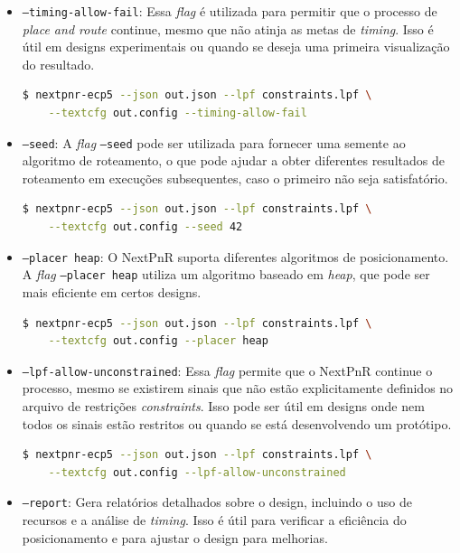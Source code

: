 \documentclass{report}
\begin{document}
\begin{itemize}
\item \texttt{--timing-allow-fail}: Essa \textit{flag} é utilizada para permitir que o processo de \textit{place and route} continue, mesmo que não atinja as metas de \textit{timing}. Isso é útil em designs experimentais ou quando se deseja uma primeira visualização do resultado.

\begin{lstlisting}[language=bash]
$ nextpnr-ecp5 --json out.json --lpf constraints.lpf \
    --textcfg out.config --timing-allow-fail
\end{lstlisting}

\item \texttt{--seed}: A \textit{flag} \texttt{--seed} pode ser utilizada para fornecer uma semente ao algoritmo de roteamento, o que pode ajudar a obter diferentes resultados de roteamento em execuções subsequentes, caso o primeiro não seja satisfatório.

\begin{lstlisting}[language=bash]
$ nextpnr-ecp5 --json out.json --lpf constraints.lpf \
    --textcfg out.config --seed 42
\end{lstlisting}

\item \texttt{--placer heap}: O NextPnR suporta diferentes algoritmos de posicionamento. A \textit{flag} \texttt{--placer heap} utiliza um algoritmo baseado em \textit{heap}, que pode ser mais eficiente em certos designs.

\begin{lstlisting}[language=bash]
$ nextpnr-ecp5 --json out.json --lpf constraints.lpf \
    --textcfg out.config --placer heap
\end{lstlisting}

\item \texttt{--lpf-allow-unconstrained}: Essa \textit{flag} permite que o NextPnR continue o processo, mesmo se existirem sinais que não estão explicitamente definidos no arquivo de restrições \textit{constraints}. Isso pode ser útil em designs onde nem todos os sinais estão restritos ou quando se está desenvolvendo um protótipo.

\begin{lstlisting}[language=bash]
$ nextpnr-ecp5 --json out.json --lpf constraints.lpf \
    --textcfg out.config --lpf-allow-unconstrained
\end{lstlisting}

\item \texttt{--report}: Gera relatórios detalhados sobre o design, incluindo o uso de recursos e a análise de \textit{timing}. Isso é útil para verificar a eficiência do posicionamento e para ajustar o design para melhorias.


\end{itemize}
\end{document}
